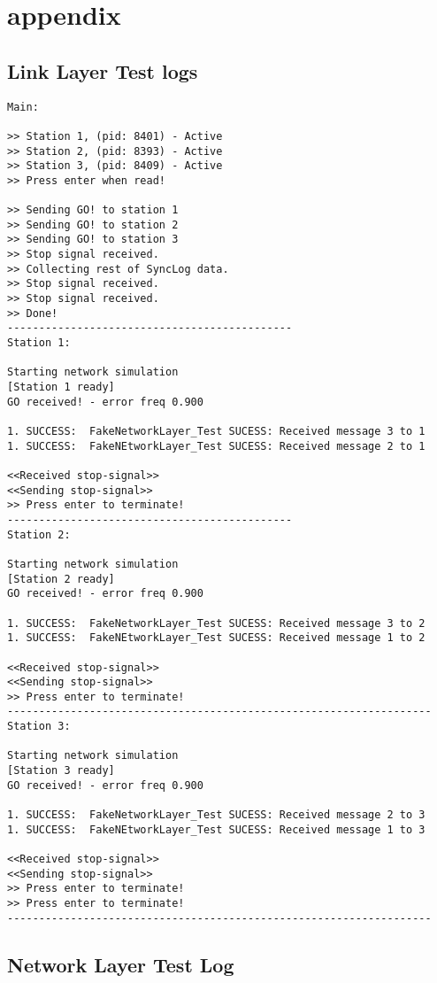 \section{appendix}


\subsection{Link Layer Test logs}
\label{apx:ll}
\begin{lstlisting}[breaklines=true]
Main:

>> Station 1, (pid: 8401) - Active
>> Station 2, (pid: 8393) - Active
>> Station 3, (pid: 8409) - Active
>> Press enter when read!

>> Sending GO! to station 1
>> Sending GO! to station 2
>> Sending GO! to station 3
>> Stop signal received.
>> Collecting rest of SyncLog data.
>> Stop signal received.
>> Stop signal received.
>> Done!
---------------------------------------------
Station 1:

Starting network simulation
[Station 1 ready]
GO received! - error freq 0.900

1. SUCCESS:  FakeNetworkLayer_Test SUCESS: Received message 3 to 1
1. SUCCESS:  FakeNEtworkLayer_Test SUCESS: Received message 2 to 1

<<Received stop-signal>>
<<Sending stop-signal>>
>> Press enter to terminate!
---------------------------------------------
Station 2:

Starting network simulation
[Station 2 ready]
GO received! - error freq 0.900

1. SUCCESS:  FakeNetworkLayer_Test SUCESS: Received message 3 to 2
1. SUCCESS:  FakeNEtworkLayer_Test SUCESS: Received message 1 to 2

<<Received stop-signal>>
<<Sending stop-signal>>
>> Press enter to terminate!
-------------------------------------------------------------------
Station 3:

Starting network simulation
[Station 3 ready]
GO received! - error freq 0.900

1. SUCCESS:  FakeNetworkLayer_Test SUCESS: Received message 2 to 3
1. SUCCESS:  FakeNEtworkLayer_Test SUCESS: Received message 1 to 3

<<Received stop-signal>>
<<Sending stop-signal>>
>> Press enter to terminate!
>> Press enter to terminate!
-------------------------------------------------------------------
\end{lstlisting}


\subsection{Network Layer Test Log}
\label{apx:nl}
